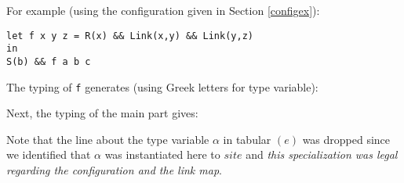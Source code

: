 \documentclass[10pt,a4paper]{article}
\newcommand{\ocaml}{\texttt}
\begin{document}
For example (using the configuration given in Section \ref{configex}):
\begin{verbatim}
let f x y z = R(x) && Link(x,y) && Link(y,z)
in
S(b) && f a b c
\end{verbatim}
The typing of \ocaml{f} generates (using Greek letters for type variable):\\

\begin{figure}[H]
  \centering
  \quad\quad
\end{figure}

Next, the typing of the main part gives:
\begin{figure}[H]
  \centering
  \quad\quad
  \quad\quad
\end{figure}

Note that the line about the type variable $\alpha$ in tabular $(e)$ was dropped since we identified that $\alpha$ was instantiated here to $site$ and \emph{this specialization was legal regarding the configuration and the link map}.
\end{document}
